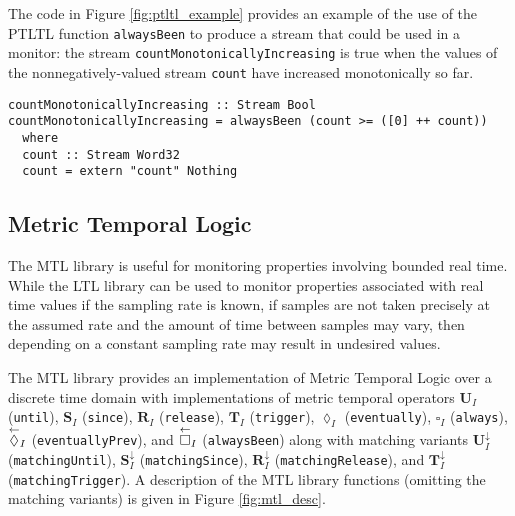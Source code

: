 The code in Figure \ref{fig:ptltl_example} provides an example of the use of the PTLTL function
\verb,alwaysBeen, to produce a stream that could be used in a monitor:
the stream \verb,countMonotonicallyIncreasing, is true when the values of
the nonnegatively-valued stream \verb,count, have increased monotonically
so far.

\begin{figure*}[!htb]
\begin{lstlisting}[frame=none]
countMonotonicallyIncreasing :: Stream Bool
countMonotonicallyIncreasing = alwaysBeen (count >= ([0] ++ count))
  where
  count :: Stream Word32
  count = extern "count" Nothing
\end{lstlisting}
\caption{An example use of a PLTL library function.}
\label{fig:ptltl_example}
\end{figure*}

\subsection{Metric Temporal Logic}
The MTL library is useful for monitoring properties involving
bounded real time.
While the LTL library can be used to monitor properties
associated with real time values if the sampling rate is known, if
samples are not taken precisely at the assumed rate and the amount
of time between samples may vary, then depending on a constant
sampling rate may result in undesired values.

The MTL library provides an implementation of Metric Temporal Logic over a discrete time domain
with implementations of metric temporal operators
$\mathbf{U}_{I}$ (\verb,until,), $\mathbf{S}_{I}$ ({\tt since}),
$\mathbf{R}_{I}$ ({\tt release}),
$\mathbf{T}_{I}$ (\verb,trigger,), $\lozenge_{I}$ ({\tt eventually}),
$\square_{I}$ (\verb,always,),
$\overset{\leftarrow}{\lozenge}_{I}$ ({\tt eventuallyPrev}), and
$\overset{\leftarrow}{\square}_{I}$ ({\tt alwaysBeen}) along with matching variants
$\mathbf{U}^{\downarrow}_{I}$ ({\tt matchingUntil}),
$\mathbf{S}^{\downarrow}_{I}$ ({\tt matchingSince}),
$\mathbf{R}^{\downarrow}_{I}$ ({\tt matchingRelease}),
and $\mathbf{T}^{\downarrow}_{I}$ ({\tt matchingTrigger}).
A description of the MTL library functions (omitting the matching variants)
is given in Figure \ref{fig:mtl_desc}.

